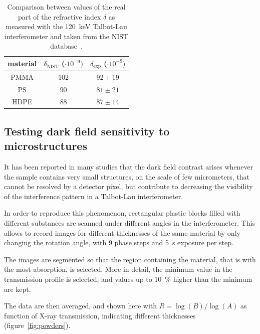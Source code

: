 \begin{table}[htb]
    \centering
    \begin{tabular}{*3c}
        \toprule
        material & $\delta_{\text{NIST}}$ ($\cdot 10^{-9})$ &
        $\delta_{\text{exp}}$ ($\cdot 10^{-9})$ \\
        \midrule
        PMMA & \num{102} & $92 \pm 19$\\
        PS & \num{90} & $81 \pm 21$\\
        HDPE & \num{88} & $87 \pm 14$\\
        \bottomrule
    \end{tabular}
    \caption{Comparison between values of the real part of the refractive
        index $\delta$ as measured with the \SI{120}{\kilo\eV} Talbot-Lau
        interferometer and taken from the NIST database~\parencite{NIST}.}
    \label{tab:delta.experiment}
\end{table}

\subsection{Testing dark field sensitivity to microstructures}
It has been reported in many studies that the dark field contrast arises
whenever the sample contains very small structures, on the scale of few
micrometers, that cannot be resolved by a detector pixel, but contribute to
decreasing the visibility of the interference pattern in a Talbot-Lau
interferometer.

In order to reproduce this phenomenon, rectangular plastic blocks filled
with different substances are scanned under different angles in the
interferometer. This allows to record images for different thicknesses of
the same material by only changing the rotation angle, with \num{9} phase
steps and \SI{5}{\second} exposure per step.

The images are segmented so that the region containing the material, that is
with the most absorption, is selected. More in detail, the minimum value in
the transmission profile is selected, and values up to
\SI{10}{\percent} higher than the minimum are kept.

The data are then averaged, and shown here with $R = \log(B) / \log(A)$ as
function of X-ray transmission, indicating different thicknesses
(figure~\ref{fig:powders}).

